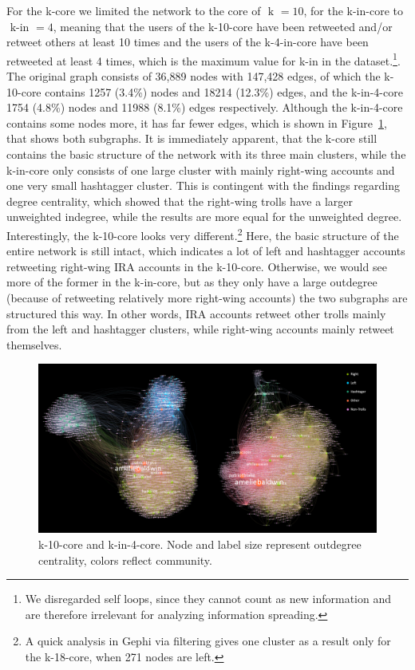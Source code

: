 \documentclass[12pt, titlepage=true, toc=bib]{scrartcl}
\begin{document}
For the k-core we limited the network to the core of \( \text{ k } = 10 \), for the k-in-core to \( \text{ k-in } = 4 \), meaning that the users of the k-10-core have been retweeted and/or retweet others at least 10 times and the users of the k-4-in-core have been retweeted at least 4 times, which is the maximum value for k-in in the dataset.\footnote{We disregarded self loops, since they cannot count as new information and are therefore irrelevant for analyzing information spreading.}. The original graph consists of 36,889 nodes with 147,428 edges, of which the k-10-core contains 1257 (3.4\%) nodes and 18214 (12.3\%) edges, and the k-in-4-core 1754 (4.8\%) nodes and 11988 (8.1\%) edges respectively. Although the k-in-4-core contains some nodes more, it has far fewer edges, which is shown in Figure~\ref{fig:kcore}, that shows both subgraphs. It is immediately apparent, that the k-core still contains the basic structure of the network with its three main clusters, while the k-in-core only consists of one large cluster with mainly right-wing accounts and one very small hashtagger cluster. This is contingent with the findings regarding degree centrality, which showed that the right-wing trolls have a larger unweighted indegree, while the results are more equal for the unweighted degree. Interestingly, the k-10-core looks very different.\footnote{A quick analysis in Gephi via filtering gives one cluster as a result only for the k-18-core, when 271 nodes are left.} Here, the basic structure of the entire network is still intact, which indicates a lot of left and hashtagger accounts retweeting right-wing IRA accounts in the k-10-core. Otherwise, we would see more of the former in the k-in-core, but as they only have a large outdegree (because of retweeting relatively more right-wing accounts) the two subgraphs are structured this way. In other words, IRA accounts retweet other trolls mainly from the left and hashtagger clusters, while right-wing accounts mainly retweet themselves.

\begin{figure}[!ht]
\centering
\includegraphics[width=0.95\linewidth]{final_k_graphs.png}
\caption[k-core and k-in-core]{k-10-core and k-in-4-core. Node and label size represent outdegree centrality, colors reflect community.}
\label{fig:kcore}
\end{figure}
\end{document}

